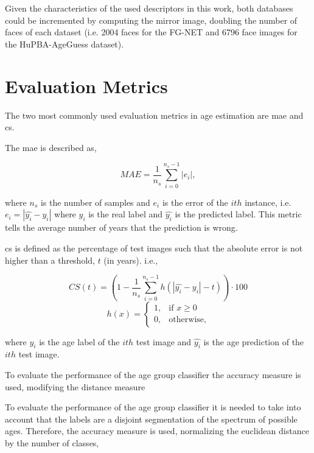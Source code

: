 Given the characteristics of the used descriptors in this work, both databases could be incremented by computing the mirror image, doubling the number of faces of each dataset (i.e. 2004 faces for the FG-NET and 6796 face images for the HuPBA-AgeGuess dataset).

\section{Evaluation Metrics} 

The two most commonly used evaluation metrics in age estimation are \acrfull{mae} and \gls{cs}.

The \gls{mae} is described as,

\begin{equation}
MAE = \frac{1}{n_{s}}\sum_{i=0}^{n_{s}-1} |e_i|,
\end{equation}

where $n_s$ is the number of samples and $e_i$ is the error of the $ith$ instance, i.e. $e_i = |\hat{y_i} - y_i|$ where $y_i $ is the real label and $\hat{y_i}$ is the predicted label. This metric tells the average number of years that the prediction is wrong.

\gls{cs} is defined as the percentage of test images such that the absolute error is not higher than a threshold, $t$ (in years). i.e.,

\begin{equation}
CS(t) = (1 - \frac{1}{n_{s}}\sum_{i=0}^{n_{s}-1} h(|\hat{y_i} - y_i| - t))\cdot 100
\end{equation}
\begin{equation}
h(x) = 
\begin{cases}
1,				& \text{if } x \geq 0\\
0,              & \text{otherwise},
\end{cases}
\end{equation}

where $y_i$ is the age label of the $ith$ test image and $\hat{y_i}$ is the age prediction of the $ith$ test image.

To evaluate the performance of the age group classifier the accuracy measure is used, modifying the distance measure 

To evaluate the performance of the age group classifier it is needed to take into account that the labels are a disjoint segmentation of the spectrum of possible ages. Therefore, the accuracy measure is used, normalizing the euclidean distance by the number of classes,

